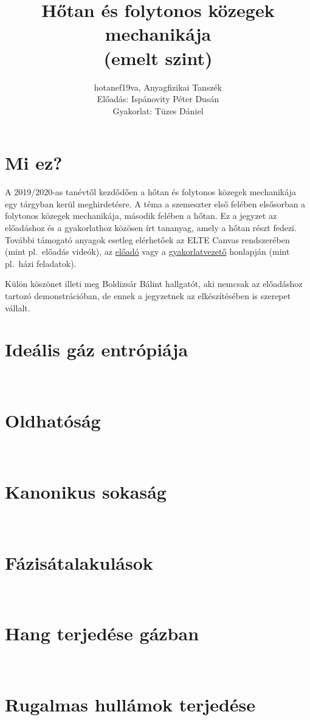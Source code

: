 \documentclass[12pt,a4paper]{scrartcl}
\numberwithin{equation}{section}
\numberwithin{table}{section}
\numberwithin{figure}{section}
\begin{document}
\title{Hőtan és folytonos közegek mechanikája\\(emelt szint)}
\author{hotanef19va, Anyagfizikai Tanszék\\
Előadás: Ispánovity Péter Dusán\\
Gyakorlat: Tüzes Dániel}
\maketitle
\tableofcontents
\section*{Mi ez?}
A 2019/2020-as tanévtől kezdődően a hőtan és folytonos közegek mechanikája egy tárgyban kerül meghirdetésre. A téma a szemeszter első felében elsősorban a folytonos közegek mechanikája, második felében a hőtan. Ez a jegyzet az előadáshoz és a gyakorlathoz közösen írt tananyag, amely a hőtan részt fedezi. További támogató anyagok esetleg elérhetőek az ELTE Canvas rendszerében (mint pl.\ előadás videók), az
\href{http://ispanovity.web.elte.hu/teaching/}{előadó} vagy a  \href{http://metal.elte.hu/~tuzes/oktatas/#folytkoz_19_20}{gyakorlatvezető} honlapján (mint pl.\ házi feladatok).

Külön köszönet illeti meg Boldizsár Bálint hallgatót, aki nemcsak az előadáshoz tartozó demonstrációban, de ennek a jegyzetnek az elkészítésében is szerepet vállalt.

\pagebreak











\section{Ideális gáz entrópiája}
~





\section{Oldhatóság}
~
\section{Kanonikus sokaság}
~


\section{Fázisátalakulások}
~
\section{Hang terjedése gázban}
~
\section{Rugalmas hullámok terjedése}
~
\end{document}
